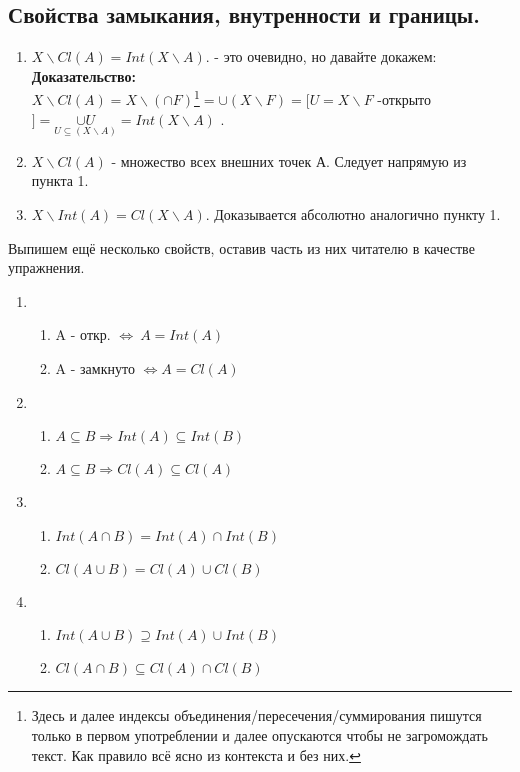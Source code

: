 \documentclass{article}
\begin{document}
\begin{spacing}{1.5}
\subsection{Свойства замыкания, внутренности и границы.}
\begin{enumerate}
\item $X\backslash Cl(A) = Int(X\backslash A)$. - это очевидно, но давайте докажем:
\\ \textbf{Доказательство:}
\\ $X\backslash Cl(A) = X\backslash(\cap F)$\footnote{Здесь и далее индексы объединения/пересечения/суммирования пишутся только в первом употреблении и далее опускаются чтобы не загромождать текст. Как правило всё ясно из контекста и без них.}$=\cup(X\backslash F)=[U = X\backslash F$ -открыто$]=\underset{U\subseteq(X\backslash A)}{\cup U}=Int(X\backslash A)$ .
\item $X\backslash Cl(A)$ - множество всех внешних точек А. Следует напрямую из пункта 1.
\item $X\backslash Int(A) = Cl(X\backslash A)$. Доказывается абсолютно аналогично пункту 1.
\end{enumerate}
Выпишем ещё несколько свойств, оставив часть из них читателю в качестве упражнения.
\begin{enumerate}
\item 
\begin{enumerate}
\item A - откр. $\Longleftrightarrow ~A = Int(A)$
\item A - замкнуто $\Longleftrightarrow A = Cl(A)$
\end{enumerate}
\item 
\begin{enumerate}
\item $A\subseteq B \Longrightarrow Int(A)\subseteq Int(B)$
\item $A\subseteq B \Longrightarrow Cl(A)\subseteq Cl(A)$
\end{enumerate}
\item
\begin{enumerate}
\item $Int(A\cap B) = Int(A)\cap Int(B)$
\item $Cl(A\cup B) = Cl(A)\cup Cl(B)$
\end{enumerate}
\item
\begin{enumerate}
\item $Int(A\cup B) \supseteq Int(A)\cup Int(B)$
\item $Cl(A\cap B) \subseteq Cl(A)\cap Cl(B)$

\end{enumerate}
\end{enumerate}
\end{spacing}
\end{document}
